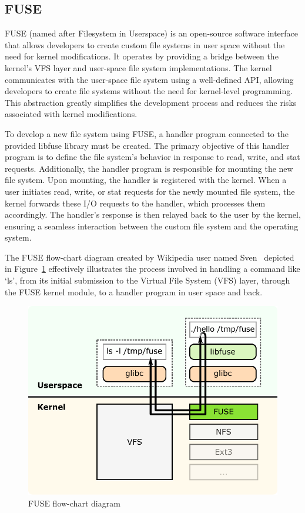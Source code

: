 \subsection{FUSE}\label{subsec:fuse}

FUSE (named after Filesystem in Userspace) is an open-source software interface that allows developers to create custom file systems in user space without the need for kernel modifications.
It operates by providing a bridge between the kernel's VFS layer and user-space file system implementations.
The kernel communicates with the user-space file system using a well-defined API, allowing developers to create file systems without the need for kernel-level programming.
This abstraction greatly simplifies the development process and reduces the risks associated with kernel modifications.

To develop a new file system using FUSE, a handler program connected to the provided libfuse library must be created.
The primary objective of this handler program is to define the file system's behavior in response to read, write, and stat requests.
Additionally, the handler program is responsible for mounting the new file system.
Upon mounting, the handler is registered with the kernel.
When a user initiates read, write, or stat requests for the newly mounted file system, the kernel forwards these I/O requests to the handler, which processes them accordingly.
The handler's response is then relayed back to the user by the kernel, ensuring a seamless interaction between the custom file system and the operating system.

The FUSE flow-chart diagram created by Wikipedia user named Sven~\cite{fuse-diagram} depicted in Figure~\ref{fig:fuse-diagram} effectively illustrates the process involved in handling a command like `ls', from its initial submission to the Virtual File System (VFS) layer, through the FUSE kernel module, to a handler program in user space and back.

\begin{figure}[ht]
    \centering
    \includegraphics[width=0.8\linewidth]{img/fuse_diagram}
    \caption{FUSE flow-chart diagram}\label{fig:fuse-diagram}
\end{figure}

